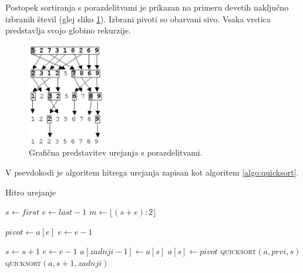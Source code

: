 \documentclass[a4paper,oneside,10pt]{article}
\begin{document}
Postopek sortiranja s porazdelitvami je prikazan na primeru devetih naključno
izbranih števil (glej sliko \ref{fig:quicksortimage}). Izbrani pivoti so obarvani sivo.
Vsaka vrstica predstavlja svojo globino rekurzije.

\begin{figure}[h]
    \begin{center}
        \includegraphics[height=45mm]{slike/quicksort.jpg}
    \end{center}
    \vspace{-0.7cm}
    \caption[Hitro urejanje]{Grafična predstavitev urejanja s porazdelitvami.}
    \label{fig:quicksortimage}
\end{figure}

V psevdokodi je algoritem hitrega urejanja zapisan kot algoritem \ref{algo:quicksort}.

\begin{algorithm}
  \caption{Hitro urejanje}\label{algo:quicksort}
  \begin{algorithmic}[1]
         \Return \EndIf
        \State $s \gets first$
        \State $e \gets last - 1$
        \State $m \gets \lfloor(s+e):2\rfloor$
        \EndIf

        \State $pivot \gets a[e]$
        \State $e \gets e - 1$

                \State $s \gets s + 1$
            \EndWhile
                \State $e \gets e - 1$
            \EndWhile
            \EndIf
        \EndWhile
        \State $a[zadnji - 1] \gets a[s]$
        \State $a[s] \gets pivot$
        \State \textsc{quicksort}$(a, prvi, s)$
        \State \textsc{quicksort}$(a, s + 1, zadnji)$
    \EndFunction
  \end{algorithmic}
\end{algorithm}
\end{document}
